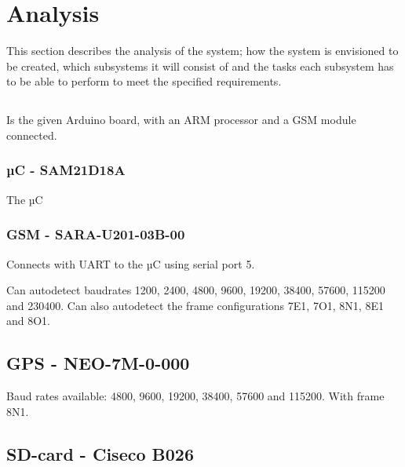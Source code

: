 
\chapter{Analysis}

This section describes the analysis of the system; how the system is envisioned to be created, which subsystems it will consist of and the tasks each subsystem has to be able to perform to meet the specified requirements.

\section{\MKR}
Is the given Arduino board, with an ARM processor and a GSM module connected.

\subsection{µC - SAM21D18A}
The µC 

\subsection{GSM - SARA-U201-03B-00}
Connects with UART to the µC using serial port 5.

Can autodetect baudrates \num{1200}, \num{2400}, \num{4800}, \num{9600}, \num{19200}, \num{38400}, \num{57600}, \num{115200} and \num{230400}. Can also autodetect the frame configurations  7E1, 7O1, 8N1, 8E1 and 8O1.

\section{GPS - NEO-7M-0-000}
Baud rates available: \num{4800}, \num{9600}, \num{19200}, \num{38400}, \num{57600} and \num{115200}. With frame 8N1.

\cite{MKRSchem}

\section{SD-card - Ciseco B026}

\FloatBarrier
